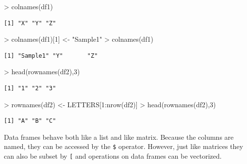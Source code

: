 \documentclass[
]{book}
\newenvironment{Shaded}{\begin{snugshade}}{\end{snugshade}}
\newcommand{\DecValTok}[1]{\textcolor[rgb]{0.00,0.00,0.81}{#1}}
\newcommand{\FunctionTok}[1]{\textcolor[rgb]{0.00,0.00,0.00}{#1}}
\newcommand{\NormalTok}[1]{#1}
\newcommand{\OtherTok}[1]{\textcolor[rgb]{0.56,0.35,0.01}{#1}}
\newcommand{\SpecialCharTok}[1]{\textcolor[rgb]{0.00,0.00,0.00}{#1}}
\newcommand{\StringTok}[1]{\textcolor[rgb]{0.31,0.60,0.02}{#1}}
\theoremstyle{definition}
\theoremstyle{definition}
\theoremstyle{definition}
\theoremstyle{definition}
\theoremstyle{remark}
\begin{document}
\begin{Shaded}
\begin{Highlighting}[]
\SpecialCharTok{\textgreater{}} \FunctionTok{colnames}\NormalTok{(df1)}
\end{Highlighting}
\end{Shaded}

\begin{verbatim}
[1] "X" "Y" "Z"
\end{verbatim}

\begin{Shaded}
\begin{Highlighting}[]
\SpecialCharTok{\textgreater{}} \FunctionTok{colnames}\NormalTok{(df1)[}\DecValTok{1}\NormalTok{] }\OtherTok{\textless{}{-}} \StringTok{"Sample1"}
\SpecialCharTok{\textgreater{}} \FunctionTok{colnames}\NormalTok{(df1)}
\end{Highlighting}
\end{Shaded}

\begin{verbatim}
[1] "Sample1" "Y"       "Z"      
\end{verbatim}

\begin{Shaded}
\begin{Highlighting}[]
\SpecialCharTok{\textgreater{}} \FunctionTok{head}\NormalTok{(}\FunctionTok{rownames}\NormalTok{(df2),}\DecValTok{3}\NormalTok{)}
\end{Highlighting}
\end{Shaded}

\begin{verbatim}
[1] "1" "2" "3"
\end{verbatim}

\begin{Shaded}
\begin{Highlighting}[]
\SpecialCharTok{\textgreater{}} \FunctionTok{rownames}\NormalTok{(df2) }\OtherTok{\textless{}{-}}\NormalTok{ LETTERS[}\DecValTok{1}\SpecialCharTok{:}\FunctionTok{nrow}\NormalTok{(df2)]}
\SpecialCharTok{\textgreater{}} \FunctionTok{head}\NormalTok{(}\FunctionTok{rownames}\NormalTok{(df2),}\DecValTok{3}\NormalTok{)}
\end{Highlighting}
\end{Shaded}

\begin{verbatim}
[1] "A" "B" "C"
\end{verbatim}

Data frames behave both like a list and like matrix. Because the columns are named, they can be accessed by the \texttt{\$}
operator. However, just like matrices they can also be subset by \texttt{{[}} and operations on data frames can be vectorized.
\end{document}
